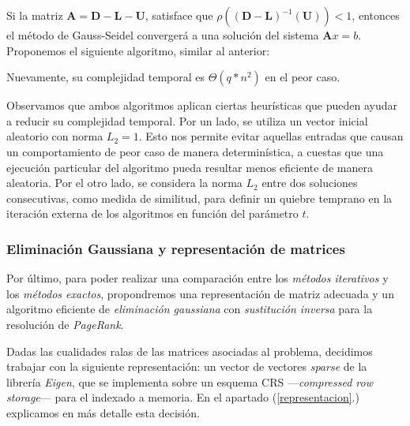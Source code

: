 \vspace{1em}
Si la matriz $\mathbf{A} = \mathbf{D} - \mathbf{L} - \mathbf{U}$, satisface que $\rho((\mathbf{D} - \mathbf{L})^{-1}(\mathbf{U})) < 1$, entonces el método de Gauss-Seidel convergerá a una solución del sistema $\mathbf{A}x = b$. Proponemos el siguiente algoritmo, similar al anterior:

\vspace{1em}


\vspace{1em}
\noindent Nuevamente, su complejidad temporal es $\Theta(q * n^2)$ en el peor caso.

\vspace{1em}
Observamos que ambos algoritmos aplican ciertas heurísticas que pueden ayudar a reducir su complejidad temporal. Por un lado, se utiliza un vector inicial aleatorio con norma $L_2 = 1$. Esto nos permite evitar aquellas entradas que causan un comportamiento de peor caso de manera determinística, a cuestas que una ejecución particular del algoritmo pueda resultar menos eficiente de manera aleatoria. Por el otro lado, se considera la norma $L_2$ entre dos soluciones consecutivas, como medida de similitud, para definir un quiebre temprano en la iteración externa de los algoritmos en función del parámetro $t$. 




\vspace{2em}
\subsubsection{Eliminación Gaussiana y representación de matrices}

Por último, para poder realizar una comparación entre los \textit{métodos iterativos} y los \textit{métodos exactos}, propondremos una representación de matriz adecuada y un algoritmo eficiente de \textit{eliminación gaussiana} con \textit{sustitución inversa} para la resolución de \textit{PageRank}.

\vspace{1em}
Dadas las cualidades ralas de las matrices asociadas al problema, decidimos trabajar con la siguiente representación: un vector de vectores \textit{sparse} de la librería \textit{Eigen}, que se implementa sobre un esquema CRS ---\textit{compressed row storage}--- para el indexado a memoria. En el apartado (\ref{representacion}.) explicamos en más detalle esta decisión.

